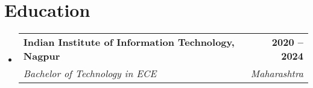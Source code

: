 \documentclass[letterpaper,11pt]{article}
\makeatletter
\newcommand{\resumeItem}[1]{
  \item\small{
    {#1 \vspace{-2pt}}
  }
}
\newcommand{\resumeSubheading}[4]{
  \vspace{-2pt}\item
    \begin{tabular*}{1.0\textwidth}[t]{l@{\extracolsep{\fill}}r}
      \textbf{#1} & \textbf{\small #2} \\
      \textit{\small#3} & \textit{\small #4} \\
    \end{tabular*}\vspace{-7pt}
}
\newcommand{\resumeSubHeadingListStart}{\begin{itemize}[leftmargin=0.0in, label={}]}
\newcommand{\resumeSubHeadingListEnd}{\end{itemize}}
\newcommand{\resumeItemListStart}{\begin{itemize}}
\newcommand{\resumeItemListEnd}{\end{itemize}\vspace{-5pt}}
\makeatother
\begin{document}
\section{Education}
  \resumeSubHeadingListStart
    \resumeSubheading
      {Indian Institute of Information Technology, Nagpur}{2020 --  2024}
      {Bachelor of Technology in ECE}{Maharashtra}
  \resumeSubHeadingListEnd





     
   

        
\end{document}

